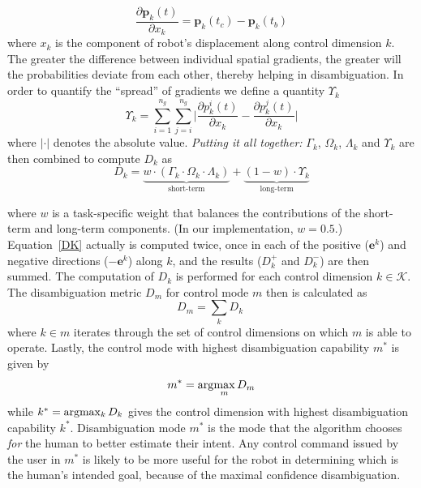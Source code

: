 \begin{equation}
\frac{\partial\boldsymbol{p}_k(t)}{\partial x_k} = \boldsymbol{p}_k(t_c) - \boldsymbol{p}_k(t_b)
\end{equation}
where $x_k$ is the component of robot's displacement along control dimension $k$. The greater the difference between individual spatial gradients, the greater will the probabilities deviate from each other, thereby helping in disambiguation. In order to quantify the ``spread'' of gradients we define a quantity $\Upsilon_k$ 
\begin{equation}
\Upsilon_k = \sum_{i=1}^{n_g}\sum_{j=i}^{n_g}\Big \lvert\frac{\partial p^i_k(t)}{\partial x_k} - \frac{\partial p^j_k(t)}{\partial x_k}\Big \rvert
\end{equation}
where $\lvert\cdot\rvert$ denotes the absolute value. 
\textit{Putting it all together:}
$\Gamma_k$, $\Omega_k$, $\Lambda_k$ and $\Upsilon_k$ are then combined to compute $D_{k}$ as 
\begin{equation}\label{DK}
D_{k} = \underbrace{w\cdot(\Gamma_k\cdot \Omega_k\cdot\Lambda_k)}_{\text{short-term}} + \underbrace{(1 - w)\cdot \Upsilon_k}_{\text{long-term}}
\end{equation}

where $w$ is a task-specific weight that balances the contributions of the short-term and long-term components. (In our implementation, $w=0.5$.) Equation~\ref{DK} actually is computed twice, once in each of the positive ($\boldsymbol{e}^k$) and negative directions ($-\boldsymbol{e}^k$) along $k$, and the results ($D_k^+$ and $D_k^-$) are then summed. The computation of $D_k$ is performed for each control dimension $k \in \mathcal{K}$. The disambiguation metric $D_m$ for control mode $m$ then is calculated as 
\begin{equation}\label{EQ2}
D_m = \sum_{k} D_{k} \;
\end{equation}
where $k \in m$ iterates through the set of control dimensions on which $m$ is able to operate.
Lastly, the control mode with highest disambiguation capability $m^*$ is given by
\begin{equation*}
m^* = \arg\!\max_m  D_{m}
\end{equation*}
while $k^* = \arg\!\max_k D_k$ gives the control dimension with highest disambiguation capability $k^{*}$.
Disambiguation mode $m^{*}$ is the mode that the algorithm chooses \textit{for} the human to better estimate their intent. Any control command issued by the user in $m^*$ is likely to be more useful for the robot in determining which is the human's intended goal, because of the maximal confidence disambiguation.

